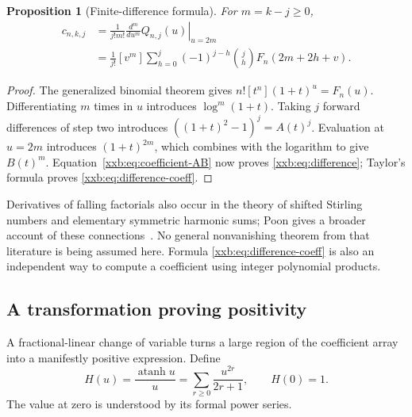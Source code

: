 \documentclass[11pt,a4paper]{article}
\numberwithin{equation}{section}
\newtheorem{proposition}[theorem]{Proposition}
\theoremstyle{definition}
\theoremstyle{remark}
\theoremstyle{plain}
\DeclareMathOperator{\atanh}{atanh}
\begin{document}
\begin{proposition}[Finite-difference formula]\label{xxb:prop:difference}
For $m=k-j\ge0$,
\begin{align}
 c_{n,k,j}
 &=\frac{1}{j!m!}
       \left.\frac{d^m}{du^m}Q_{n,j}(u)\right|_{u=2m}
       \label{xxb:eq:difference}\\
 &=\frac1{j!}[v^m]\sum_{h=0}^j(-1)^{j-h}\binom jh
       F_n(2m+2h+v).\label{xxb:eq:difference-coeff}
\end{align}
\end{proposition}
\begin{proof}
The generalized binomial theorem gives
$n![t^n](1+t)^u=F_n(u)$. Differentiating $m$ times in $u$ introduces
$\log^m(1+t)$. Taking $j$ forward differences of step two introduces
$((1+t)^2-1)^j=A(t)^j$. Evaluation at $u=2m$ introduces
$(1+t)^{2m}$, which combines with the logarithm to give $B(t)^m$.
Equation~\eqref{xxb:eq:coefficient-AB} now proves \eqref{xxb:eq:difference};
Taylor's formula proves \eqref{xxb:eq:difference-coeff}.
\end{proof}

Derivatives of falling factorials also occur in the theory of shifted
Stirling numbers and elementary symmetric harmonic sums; Poon gives a
broader account of these connections~\cite{poon}. No general nonvanishing
theorem from that literature is being assumed here. Formula
\eqref{xxb:eq:difference-coeff} is also an independent way to compute a
coefficient using integer polynomial products.

\subsection{A transformation proving positivity}\label{xxb:sec:positivity}
A fractional-linear change of variable turns a large region of the
coefficient array into a manifestly positive expression. Define
\begin{equation}\label{xxb:eq:H}
 H(u)=\frac{\atanh u}{u}=\sum_{r\ge0}\frac{u^{2r}}{2r+1},
 \qquad H(0)=1.
\end{equation}
The value at zero is understood by its formal power series.
\end{document}

